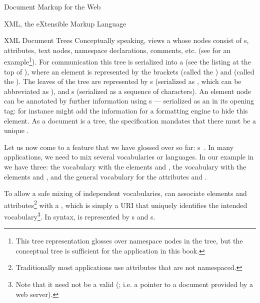 \begin{omgroup}[id=markup-web]{Document Markup for the Web}
\begin{omgroup}[id=xml]{XML, the eXtensible Markup Language}
\begin{omgroup}[id=xml-tree]{XML Document Trees}
Conceptually speaking, {\xml} views a  whose
nodes consist of {s}, attributes, text nodes, namespace declarations,
{\xml} comments, etc. (see {} for an example\footnote{This tree
  representation glosses over namespace nodes in the tree, but the conceptual tree is
  sufficient for the application in this book.}). For communication this tree is
serialized into a {} (see the listing at the top
of {}), where an element {} is represented by the brackets
{} (called the {}) and {} (called the
{}). The leaves of the tree are represented by
{s} (serialized as {}, which can be abbreviated
as {}), and {s} (serialized as a sequence of {\unicode}
characters).  An element node can be annotated by further information using
{s} --- serialized as an {} in its opening tag:
for instance {} might add the information for a formatting
engine to hide this element. As a document is a tree, the {\xml} specification mandates
that there must be a unique {}.

Let us now come to a feature that we have glossed over so far: {\xml}
{s}~\cite{BraHol:xmlns99}. In many {\xml} applications, we need to mix
several {\xml} vocabularies or languages. In our example in {} we have
three: the {\omdoc} vocabulary with the elements {} and {},
the {\openmath} vocabulary with the elements {} and
{}, and the general {\xml} vocabulary for the attributes
{} and {}.

To allow a safe mixing of independent {\xml} vocabularies, {\xml} can associate elements
and attributes\footnote{Traditionally most {\xml} applications use attributes that are not
  namespaced.} with a {}, which is simply a URI that
uniquely identifies the intended vocabulary\footnote{Note that it need not be a valid
  {} ({}; i.e.  a pointer to a document
  provided by a web server).}.  In {\xml} syntax, {} is
represented by {s} and {s}.


\end{omgroup}
\end{omgroup}
\end{omgroup}
